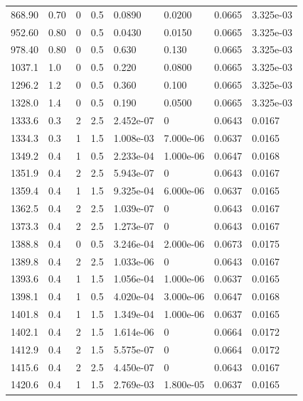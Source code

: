 \documentclass[preview]{standalone}
\begin{document}
{{\begin{tabular}{L{1.2cm}C{1.2cm} C{0.3cm}C{0.5cm} C{1.4cm}C{1.4cm} C{1.4cm}C{1.4cm}}
  868.90  &  0.70  & 0     & 0.5 &  0.0890  & 0.0200  & 0.0665 &  3.325e-03   \\ 
  952.60  &  0.80  & 0     & 0.5 &  0.0430  & 0.0150  & 0.0665 &  3.325e-03   \\ 
  978.40  &  0.80  & 0     & 0.5 &  0.630  & 0.130  & 0.0665 &  3.325e-03   \\ 
  1037.1  &   1.0  & 0     & 0.5 &  0.220  & 0.0800  & 0.0665 &  3.325e-03   \\ 
  1296.2  &   1.2  & 0     & 0.5 &  0.360  & 0.100  & 0.0665 &  3.325e-03   \\ 
  1328.0  &   1.4  & 0     & 0.5 &  0.190  & 0.0500  & 0.0665 &  3.325e-03   \\ 
  1333.6  &   0.3  & 2     & 2.5 &  2.452e-07  & 0  & 0.0643 &  0.0167   \\ 
  1334.3  &   0.3  & 1     & 1.5 &  1.008e-03  & 7.000e-06  & 0.0637 &  0.0165   \\ 
  1349.2  &   0.4  & 1     & 0.5 &  2.233e-04  & 1.000e-06  & 0.0647 &  0.0168   \\ 
  1351.9  &   0.4  & 2     & 2.5 &  5.943e-07  & 0  & 0.0643 &  0.0167   \\ 
  1359.4  &   0.4  & 1     & 1.5 &  9.325e-04  & 6.000e-06  & 0.0637 &  0.0165   \\ 
  1362.5  &   0.4  & 2     & 2.5 &  1.039e-07  & 0  & 0.0643 &  0.0167   \\ 
  1373.3  &   0.4  & 2     & 2.5 &  1.273e-07  & 0  & 0.0643 &  0.0167   \\ 
  1388.8  &   0.4  & 0     & 0.5 &  3.246e-04  & 2.000e-06  & 0.0673 &  0.0175   \\ 
  1389.8  &   0.4  & 2     & 2.5 &  1.033e-06  & 0  & 0.0643 &  0.0167   \\ 
  1393.6  &   0.4  & 1     & 1.5 &  1.056e-04  & 1.000e-06  & 0.0637 &  0.0165   \\ 
  1398.1  &   0.4  & 1     & 0.5 &  4.020e-04  & 3.000e-06  & 0.0647 &  0.0168   \\ 
  1401.8  &   0.4  & 1     & 1.5 &  1.349e-04  & 1.000e-06  & 0.0637 &  0.0165   \\ 
  1402.1  &   0.4  & 2     & 1.5 &  1.614e-06  & 0  & 0.0664 &  0.0172   \\ 
  1412.9  &   0.4  & 2     & 1.5 &  5.575e-07  & 0  & 0.0664 &  0.0172   \\ 
  1415.6  &   0.4  & 2     & 2.5 &  4.450e-07  & 0  & 0.0643 &  0.0167   \\ 
  1420.6  &   0.4  & 1     & 1.5 &  2.769e-03  & 1.800e-05  & 0.0637 &  0.0165   \\ 

\end{tabular}}}
\end{document}
